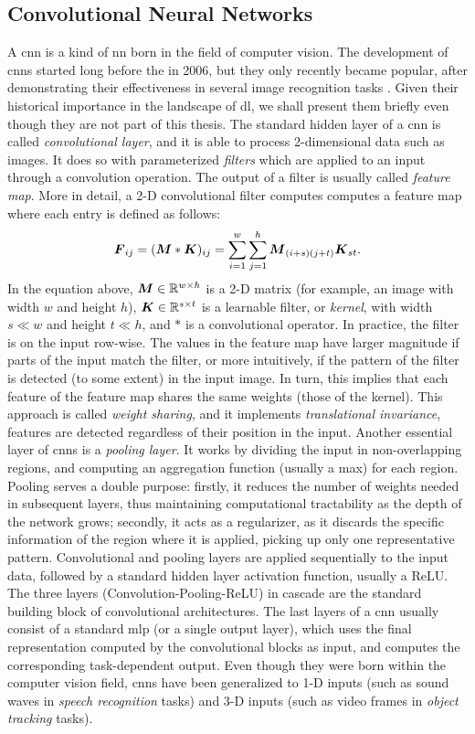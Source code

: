 \subsection{Convolutional Neural Networks}
A \gls{cnn} \citep{lecun1995convolutionalnn} is a kind of \gls{nn} born in the field of computer vision. The development of \glspl{cnn} started long before the  in 2006, but they only recently became popular, after demonstrating their effectiveness in several image recognition tasks \citep{krizhevsky2017imagenet}. Given their historical importance in the landscape of \gls{dl}, we shall present them briefly even though they are not part of this thesis. The standard hidden layer of a \gls{cnn} is called \emph{convolutional layer}, and it is able to process 2-dimensional data such as images. It does so with parameterized \emph{filters} which are applied to an input through a convolution operation. The output of a filter is usually called \emph{feature map}. More in detail, a 2-D convolutional filter computes computes a feature map where each entry is defined as follows:
$$\Matrix{F}_{ij} = (\Matrix{M} * \Matrix{K})_{ij} = \sum_{i=1}^{w} \sum_{j=1}^{h} \Matrix{M}_{(i+s)(j+t)}\Matrix{K}_{st}.$$
In the equation above, $\Matrix{M} \in \Real^{w \times h}$ is a 2-D matrix (for example, an image with width $w$ and height $h$), $\Matrix{K} \in \Real^{s \times t}$ is a learnable filter, or \emph{kernel}, with width $s \ll w$ and height $t \ll h$, and $*$ is a convolutional operator. In practice, the filter is  on the input row-wise. The values in the feature map have larger magnitude if parts of the input match the filter, or more intuitively, if the pattern of the filter is detected (to some extent) in the input image. In turn, this implies that each feature of the feature map shares the same weights (those of the kernel). This approach is called \emph{weight sharing}, and it implements \emph{translational invariance}, \ie features are detected regardless of their position in the input. Another essential layer of \glspl{cnn} is a \emph{pooling layer}. It works by dividing the input in non-overlapping regions, and computing an aggregation function (usually a max) for each region. Pooling serves a double purpose: firstly, it reduces the number of weights needed in subsequent layers, thus maintaining computational tractability as the depth of the network grows; secondly, it acts as a regularizer, as it discards the specific information of the region where it is applied, picking up only one representative pattern. Convolutional and pooling layers are applied sequentially to the input data, followed by a standard hidden layer activation function, usually a ReLU. The three layers (Convolution-Pooling-ReLU) in cascade are the standard building block of convolutional architectures. The last layers of a \gls{cnn} usually consist of a standard \gls{mlp} (or a single output layer), which uses the final representation computed by the convolutional blocks as input, and computes the corresponding task-dependent output. Even though they were born within the computer vision field, \glspl{cnn} have been generalized to 1-D inputs (such as sound waves in \emph{speech recognition} tasks) and 3-D inputs (such as video frames in \emph{object tracking} tasks).

